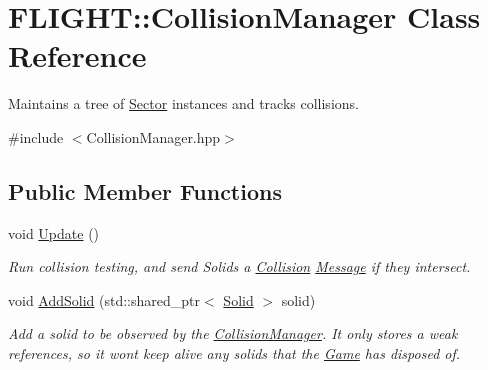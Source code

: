 \hypertarget{class_f_l_i_g_h_t_1_1_collision_manager}{}\section{F\+L\+I\+G\+HT\+:\+:Collision\+Manager Class Reference}
\label{class_f_l_i_g_h_t_1_1_collision_manager}


Maintains a tree of \hyperlink{class_f_l_i_g_h_t_1_1_sector}{Sector} instances and tracks collisions.  




{\ttfamily \#include $<$Collision\+Manager.\+hpp$>$}

\subsection*{Public Member Functions}
\begin{DoxyCompactItemize}
\item 
\mbox{\label{class_f_l_i_g_h_t_1_1_collision_manager_a98090be416f92b3cbd40832f0373c87d}} 
void \hyperlink{class_f_l_i_g_h_t_1_1_collision_manager_a98090be416f92b3cbd40832f0373c87d}{Update} ()
\begin{DoxyCompactList}\small\item\em Run collision testing, and send Solids a \hyperlink{struct_f_l_i_g_h_t_1_1_collision}{Collision} \hyperlink{class_f_l_i_g_h_t_1_1_message}{Message} if they intersect. \end{DoxyCompactList}\item 
\mbox{\label{class_f_l_i_g_h_t_1_1_collision_manager_ac515f3f53a14b58d7cc111bfe3e573db}} 
void \hyperlink{class_f_l_i_g_h_t_1_1_collision_manager_ac515f3f53a14b58d7cc111bfe3e573db}{Add\+Solid} (std\+::shared\+\_\+ptr$<$ \hyperlink{class_f_l_i_g_h_t_1_1_solid}{Solid} $>$ solid)
\begin{DoxyCompactList}\small\item\em Add a solid to be observed by the \hyperlink{class_f_l_i_g_h_t_1_1_collision_manager}{Collision\+Manager}. It only stores a weak references, so it won\textquotesingle{}t keep alive any solids that the \hyperlink{class_f_l_i_g_h_t_1_1_game}{Game} has disposed of. \end{DoxyCompactList}\end{DoxyCompactItemize}


